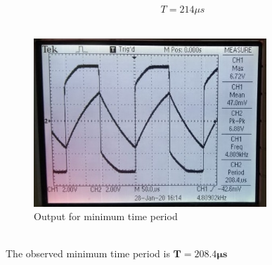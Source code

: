 \documentclass[12pt]{article}
\begin{document}
        \begin{equation}
            \boxed{T = 214\mu s}
        \end{equation}
        \\
        \begin{figure}[H]
            \centering
            \includegraphics[width = 0.6\linewidth, height = 2.5in]{reports/lab2/astableMin.jpeg}
            \caption{Output for minimum time period}
        \end{figure}
        \\
        The observed minimum time period is $\mathbf{T = 208.4\mu s}$\\
\end{document}
